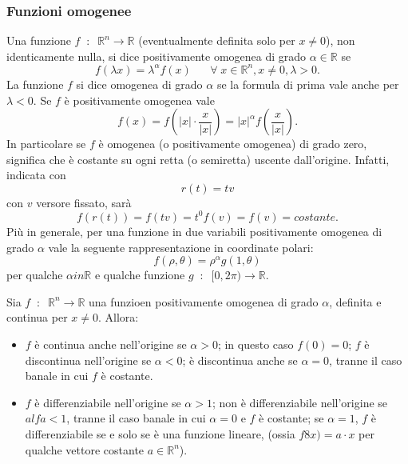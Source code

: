 \subsubsection*{Funzioni omogenee}
Una funzione $f \;\;:\;\; \mathbb{R}^n \rightarrow \mathbb{R}$ (eventualmente definita solo per $x\neq 0$), non identicamente nulla, si dice positivamente omogenea di grado $\alpha \in \mathbb{R}$ se
\[
    f(\lambda x) = \lambda^\alpha f(x) \;\;\;\;\; \;\forall\;x \in \mathbb{R}^n, x\neq 0, \lambda>0.
\]
La funzione $f$ si dice omogenea di grado $\alpha$ se la formula di prima vale anche per $\lambda<0$.\newline
Se $f$ è positivamente omogenea vale
\[
    f(x) = f( |x| \cdot \frac{x}{|x|}) = |x|^\alpha f(\frac{x}{|x|}).
\]
In particolare se $f$ è omogenea (o positivamente omogenea) di grado zero, significa che è costante su ogni retta (o semiretta) uscente dall'origine. Infatti, indicata con
\[
    r(t)=tv
\]
con $v$ versore fissato, sarà
\[
    f(r(t))=f(tv)=t^0f(v)=f(v)=costante.
\]
Più in generale, per una funzione in due variabili positivamente omogenea di grado $\alpha$ vale la seguente rappresentazione in coordinate polari:
\[
    f(\rho, \theta)=\rho^\alpha g(1,\theta)
\]
per qualche $\alpha in \mathbb{R}$ e qualche funzione $g \;\;:\;\; [0, 2\pi) \rightarrow \mathbb{R}$.\newline

Sia $f \;\;:\;\; \mathbb{R}^n \rightarrow \mathbb{R}$ una funzioen positivamente omogenea di grado $\alpha$, definita e continua per $x\neq 0$. Allora:
\begin{itemize}
    \item $f$ è continua anche nell'origine se $\alpha>0$; in questo caso $f(0) = 0$; $f$ è discontinua nell'origine se $\alpha<0$; è discontinua anche se $\alpha=0$, tranne il caso banale in cui $f$ è costante.
    \item $f$ è differenziabile nell'origine se $\alpha>1$; non è differenziabile nell'origine se $alfa <1$, tranne il caso banale in cui $\alpha=0$ e $f$ è costante; se $\alpha=1$, $f$ è differenziabile se e solo se è una funzione lineare, (ossia $f8x) = a \cdot x$ per qualche vettore costante $a \in \mathbb{R}^n$).
\end{itemize}